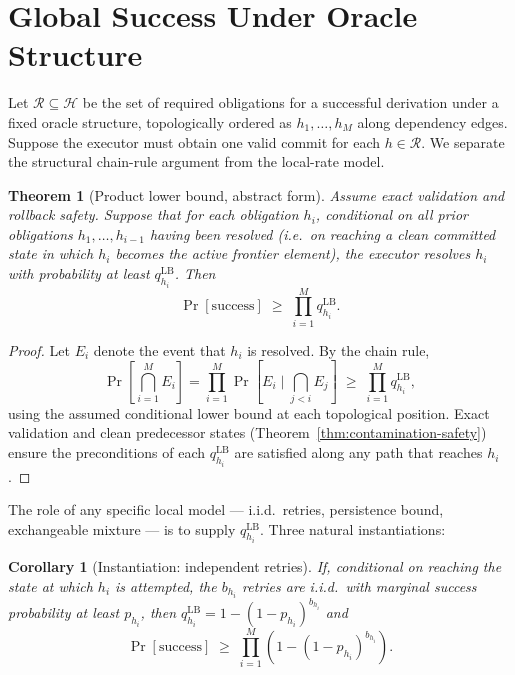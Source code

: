 \documentclass[11pt]{article}
\newtheorem{theorem}{Theorem}
\newtheorem{corollary}{Corollary}
\newcommand{\Obligations}{\mathcal{H}}
\begin{document}
\section{Global Success Under Oracle Structure}

Let $\mathcal{R} \subseteq \Obligations$ be the set of required obligations for a
successful derivation under a fixed oracle structure, topologically ordered
as $h_1,\ldots,h_M$ along dependency edges. Suppose the executor must obtain
one valid commit for each $h\in\mathcal{R}$. We separate the structural
chain-rule argument from the local-rate model.

\begin{theorem}[Product lower bound, abstract form]
\label{thm:product-abstract}
Assume exact validation and rollback safety. Suppose that for each obligation
$h_i$, conditional on all prior obligations $h_1,\ldots,h_{i-1}$ having been
resolved (i.e.\ on reaching a clean committed state in which $h_i$ becomes
the active frontier element), the executor resolves $h_i$ with probability
at least $q_{h_i}^{\mathrm{LB}}$. Then
\[
\Pr[\mathrm{success}]
\;\ge\;
\prod_{i=1}^{M} q_{h_i}^{\mathrm{LB}}.
\]
\end{theorem}

\begin{proof}
Let $E_i$ denote the event that $h_i$ is resolved. By the chain rule,
\[
\Pr\!\left[\bigcap_{i=1}^{M}E_i\right]
=\prod_{i=1}^{M}\Pr\!\left[E_i\;\bigg|\;\bigcap_{j<i}E_j\right]
\;\ge\;
\prod_{i=1}^{M} q_{h_i}^{\mathrm{LB}},
\]
using the assumed conditional lower bound at each topological position.
Exact validation and clean predecessor states (Theorem~\ref{thm:contamination-safety}) ensure the
preconditions of each $q_{h_i}^{\mathrm{LB}}$ are satisfied along any path
that reaches $h_i$.
\end{proof}

The role of any specific local model — i.i.d.\ retries, persistence bound,
exchangeable mixture — is to supply $q_{h_i}^{\mathrm{LB}}$. Three natural
instantiations:

\begin{corollary}[Instantiation: independent retries]
\label{cor:product-iid}
If, conditional on reaching the state at which $h_i$ is attempted, the
$b_{h_i}$ retries are i.i.d.\ with marginal success probability at least
$p_{h_i}$, then $q_{h_i}^{\mathrm{LB}} = 1-(1-p_{h_i})^{b_{h_i}}$ and
\[
\Pr[\mathrm{success}]
\;\ge\;
\prod_{i=1}^{M}\left(1-(1-p_{h_i})^{b_{h_i}}\right).
\]
\end{corollary}
\end{document}
